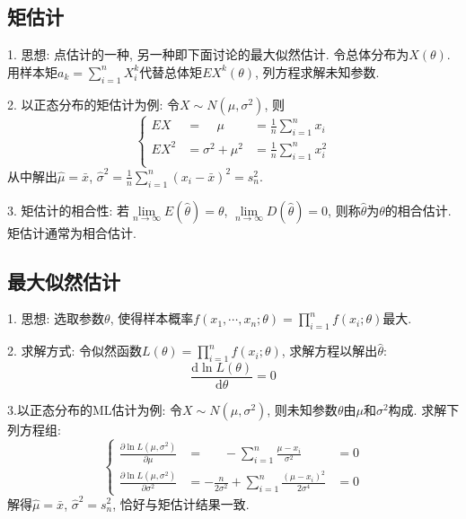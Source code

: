 \subsection{矩估计}

1. 思想: 点估计的一种, 另一种即下面讨论的最大似然估计. 令总体分布为$X(\theta)$. 用样本矩$a_k=\sum\limits_{i=1}^n X_i^k$代替总体矩$EX^k(\theta)$, 列方程求解未知参数.

2. 以正态分布的矩估计为例: 令$X \sim N(\mu,\sigma^2)$, 则
\begin{equation*}
    \left\{\begin{aligned}
        EX &=~~~~~\mu&=\frac{1}{n}\sum\limits_{i=1}^n x_i\\
        EX^2 &=\sigma^2+\mu^2&=\frac{1}{n}\sum\limits_{i=1}^n x_i^2\\
    \end{aligned}\right.
\end{equation*}
从中解出$\hat{\mu}=\bar{x}$, $\hat{\sigma}^2=\frac{1}{n}\sum\limits_{i=1}^n(x_i-\bar{x})^2 =s_n^2$.

3. 矩估计的相合性: 若$\lim\limits_{n\rightarrow \infty} E(\hat{\theta})=\theta$, $\lim\limits_{n\rightarrow \infty} D(\hat{\theta})=0$, 则称$\hat{\theta}$为$\theta$的相合估计. 矩估计通常为相合估计.

\subsection{最大似然估计}

1. 思想: 选取参数$\theta$, 使得样本概率$f(x_1,\cdots,x_n;\theta)=\prod\limits_{i=1}^n f(x_i;\theta)$最大.

2. 求解方式: 令似然函数$L(\theta)=\prod\limits_{i=1}^n f(x_i;\theta)$, 求解方程以解出$\hat{\theta}$:
\begin{equation*}
    \frac{\mathrm{d}\ln L(\theta)}{\mathrm{d}\theta}=0
\end{equation*}

3.以正态分布的ML估计为例: 令$X \sim N(\mu,\sigma^2)$, 则未知参数$\theta$由$\mu$和$\sigma^2$构成. 求解下列方程组:
\begin{equation*}
    \left\{\begin{aligned}
        \frac{\partial \ln L(\mu,\sigma^2)}{\partial \mu} & = ~~~~~~~-\sum\limits_{i=1}^n \frac{\mu -x_i}{\sigma^2}&=0\\
        \frac{\partial \ln L(\mu,\sigma^2)}{\partial \sigma^2} & = -\frac{n}{2\sigma^2}+\sum\limits_{i=1}^n \frac{(\mu -x_i)^2}{2\sigma^4}&=0
    \end{aligned}\right.
\end{equation*}
解得$\hat{\mu}=\bar{x}$, $\hat{\sigma}^2=s_n^2$, 恰好与矩估计结果一致.

